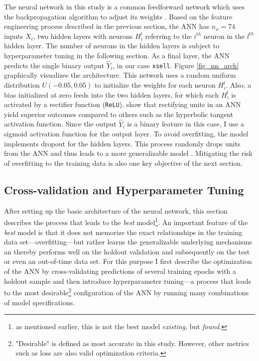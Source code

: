\documentclass[12pt,a4paper]{article}
\let\code=\texttt
\begin{document}
The neural network in this study is a common feedforward network which uses the backpropagation algorithm to adjust its weights \citep{werbosBackpropagationTimeWhat1990}.
Based on the feature engineering process described in the previous section, the ANN has $n_x = 74$ inputs $X_i$, 
two hidden layers with neurons $H_i^l$ referring to the $i^{th}$ neuron in the $l^{th}$ hidden layer. 
The number of neurons in the hidden layers is subject to hyperparameter tuning in the following section.
As a final layer, the ANN predicts the single binary output $\hat{Y}_i$, in our case \code{xsell}.
Figure \ref{fig_nn_arch} graphically visualizes the architecture.
 \label{fig_nn_arch}
This network uses a random uniform distribution $U(-0.05, 0.05)$ to initialize the weights for each neuron $H_i^l$.
Also, a bias initialized at zero feeds into the two hidden layers, for which each $H_i^l$ is activated by a rectifier function (\code{ReLU}).
\cite{glorotDeepSparseRectifier2011} show that rectifying units in an ANN yield superior outcomes compared to others such as the hyperbolic tangent activation function. Since the output $\hat{Y}_i$ is a binary feature in this case, I use a sigmoid activation function for the output layer.
To avoid overfitting, the model implements dropout for the hidden layers.
This process randomly drops units from the ANN and thus leads to a more generalizable model \citep{srivastavaDropoutSimpleWay2014}.
Mitigating the risk of overfitting to the training data is also one key objective of the next section.

\subsection{Cross-validation and Hyperparameter Tuning} \label{sec_crossval}
After setting up the basic architecture of the neural network, this section describes the process that leads to the \textit{best} model\footnote{as mentioned earlier, this is not the best model \textit{existing}, but \textit{found}.}.
An important feature of the \textit{best} model is that it does not memorize the exact relationships in the training data set---overfitting---but
rather learns the generalizable underlying mechanisms an thereby performs well on the holdout validation and subsequently on the test or even an out-of-time data set. 
For this purpose I first describe the optimization of the ANN by cross-validating predictions of several training epochs with a holdout 
sample and then introduce hyperparameter tuning---a process that leads to the most desirable\footnote{"Desirable" is defined as most accurate in this study. However, other metrics such as loss are also valid optimization criteria.} configuration of the ANN by
running many combinations of model specifications.
\end{document}
